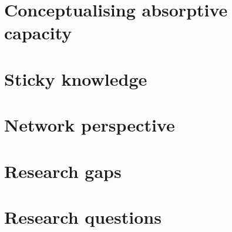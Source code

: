 
%

\section{Conceptualising absorptive capacity}

\section{Sticky knowledge}

\section{Network perspective}

\section{Research gaps}

\section{Research questions}

%